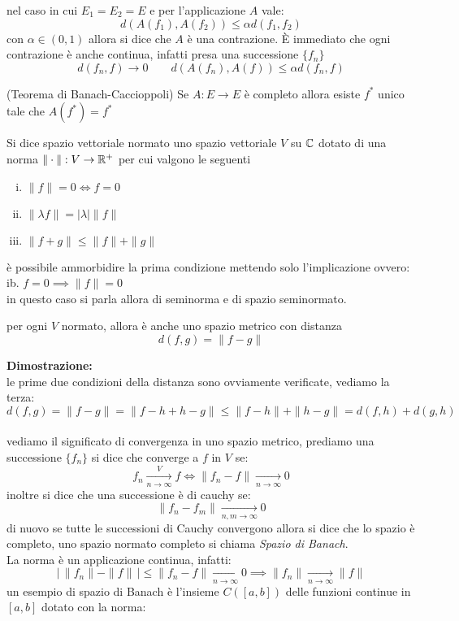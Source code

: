 nel caso in cui $E_1=E_2=E$ e per l'applicazione $A$ vale:
\[d(A(f_1),A(f_2))\leq\alpha d(f_1,f_2)\]
con $\alpha\in(0,1)$ allora si dice che $A$ è una contrazione. È immediato che ogni contrazione è anche continua, infatti presa una successione $\{f_n\}$
\[d(f_n,f)\to0 \qquad d(A(f_n),A(f))\leq\alpha d(f_n,f)\]
\begin{thm}
(Teorema di Banach-Caccioppoli) Se $A:E\to E$ è completo allora esiste $f^*$ unico tale che $A(f^*) = f^*$
\end{thm}
\begin{dfn}
Si dice spazio vettoriale normato uno spazio vettoriale $V$ su $\mathbb{C}$ dotato di una norma $\|\cdot \|:V\to\mathbb{R}^+$
per cui valgono le seguenti
\begin{enumerate}[i.]
\item $\|f\| = 0\iff f=0$
\item $\|\lambda f\|= |\lambda| \|f\|$
\item $\|f+g\|\leq \|f\|+\|g\|$
\end{enumerate}
\end{dfn}
è possibile ammorbidire la prima condizione mettendo solo l'implicazione ovvero:\\ ib. $f=0\implies \|f\|=0$\\
in questo caso si parla allora di seminorma e di spazio seminormato.
\begin{thm}
per ogni $V$ normato, allora è anche uno spazio metrico con distanza
\[d(f,g) = \|f-g\|\]
\end{thm}
\hspace{-1.6em}\textbf{Dimostrazione:}\\
le prime due condizioni della distanza sono ovviamente verificate, vediamo la terza:
\[d(f,g) =  \|f-g\| =  \|f-h+h-g\|\leq  \|f-h\|+ \|h-g\| = d(f,h) + d(g,h)\]
\\
vediamo il significato di convergenza in uno spazio metrico, prediamo una successione $\{f_n\}$ si dice che converge a $f$ in $V$ se:
\[f_n  \xrightarrow[n\to \infty]{V} f\iff \|f_n-f\| \xrightarrow[n\to \infty]{} 0\]
inoltre si dice che una successione è di cauchy se:
\[ \|f_n-f_m\| \xrightarrow[n,m\to \infty]{} 0\]
di nuovo se tutte le successioni di Cauchy convergono allora si dice che lo spazio è completo, uno spazio normato completo si chiama \emph{Spazio di Banach}.\\
La norma è un applicazione continua, infatti:
\[|\,\|f_n\|-\|f\|\,|\leq \|f_n-f\|\xrightarrow[n\to \infty]{} 0 \implies \|f_n\|\xrightarrow[n\to \infty]{} \|f\|\]
un esempio di spazio di Banach è l'insieme $C([a,b])$ delle funzioni continue in $[a,b]$ dotato con la norma:
